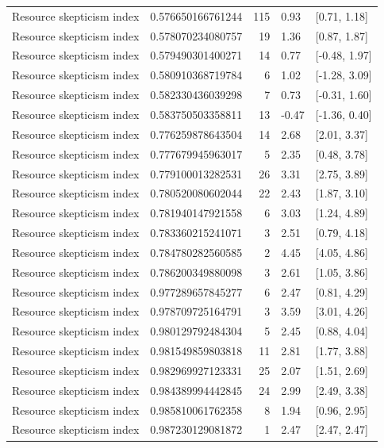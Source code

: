 \begin{tabular}{llrll}
\addlinespace
Resource skepticism index & 0.576650166761244 & 115 & 0.93 & {}[0.71, 1.18]\\
Resource skepticism index & 0.578070234080757 & 19 & 1.36 & {}[0.87, 1.87]\\
Resource skepticism index & 0.579490301400271 & 14 & 0.77 & {}[-0.48, 1.97]\\
Resource skepticism index & 0.580910368719784 & 6 & 1.02 & {}[-1.28, 3.09]\\
Resource skepticism index & 0.582330436039298 & 7 & 0.73 & {}[-0.31, 1.60]\\
\addlinespace
Resource skepticism index & 0.583750503358811 & 13 & -0.47 & {}[-1.36, 0.40]\\
Resource skepticism index & 0.776259878643504 & 14 & 2.68 & {}[2.01, 3.37]\\
Resource skepticism index & 0.777679945963017 & 5 & 2.35 & {}[0.48, 3.78]\\
Resource skepticism index & 0.779100013282531 & 26 & 3.31 & {}[2.75, 3.89]\\
Resource skepticism index & 0.780520080602044 & 22 & 2.43 & {}[1.87, 3.10]\\
\addlinespace
Resource skepticism index & 0.781940147921558 & 6 & 3.03 & {}[1.24, 4.89]\\
Resource skepticism index & 0.783360215241071 & 3 & 2.51 & {}[0.79, 4.18]\\
Resource skepticism index & 0.784780282560585 & 2 & 4.45 & {}[4.05, 4.86]\\
Resource skepticism index & 0.786200349880098 & 3 & 2.61 & {}[1.05, 3.86]\\
Resource skepticism index & 0.977289657845277 & 6 & 2.47 & {}[0.81, 4.29]\\
\addlinespace
Resource skepticism index & 0.978709725164791 & 3 & 3.59 & {}[3.01, 4.26]\\
Resource skepticism index & 0.980129792484304 & 5 & 2.45 & {}[0.88, 4.04]\\
Resource skepticism index & 0.981549859803818 & 11 & 2.81 & {}[1.77, 3.88]\\
Resource skepticism index & 0.982969927123331 & 25 & 2.07 & {}[1.51, 2.69]\\
Resource skepticism index & 0.984389994442845 & 24 & 2.99 & {}[2.49, 3.38]\\
\addlinespace
Resource skepticism index & 0.985810061762358 & 8 & 1.94 & {}[0.96, 2.95]\\
Resource skepticism index & 0.987230129081872 & 1 & 2.47 & {}[2.47, 2.47]\\

\end{tabular}
